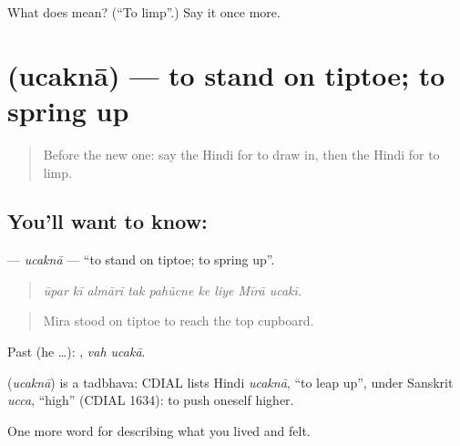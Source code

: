 \begin{tcolorbox}[breakable,colback=teal!4,colframe=teal!35!black,title={Before you move on}]
What does  mean? (\textquotedblleft{}To limp\textquotedblright{}.) Say it once more.
\end{tcolorbox}
\section[\texorpdfstring{\hi{उचकना} (ucaknā)}{उचकना (ucaknā)}]{ (ucaknā) — to stand on tiptoe; to spring up}

\label{lesson:HI-C481-ucakna}



\begin{quote}
Before the new one: say the Hindi for to draw in, then the Hindi for to limp.
\end{quote}

\subsection*{You'll want to know: }
\textbf{} — \emph{ucaknā} — \textquotedblleft{}to stand on tiptoe; to spring up\textquotedblright{}.

\begin{quote}
        
\end{quote}

\begin{quote}
\emph{ūpar kī almārī tak pahũcne ke liye Mīrā ucakī.}
\end{quote}

\begin{quote}
Mira stood on tiptoe to reach the top cupboard.
\end{quote}

Past (he …):  , \emph{vah ucakā}.

\begin{cousinweb}
\textbf{} (\emph{ucaknā}) is a tadbhava: CDIAL lists Hindi \emph{ucaknā}, \textquotedblleft{}to leap up\textquotedblright{}, under Sanskrit \emph{ucca}, \textquotedblleft{}high\textquotedblright{} (CDIAL 1634): to push oneself higher.
\end{cousinweb}

\begin{grammarlens}[title={What you've built}]
One more word for describing what you lived and felt.
\end{grammarlens}

